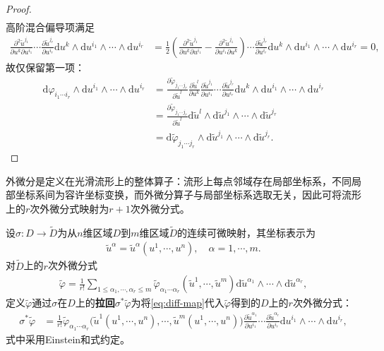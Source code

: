 \documentclass[../../main.tex]{subfiles}%
\begin{document}
\begin{proof}
\begin{align*}
\end{align*}
高阶混合偏导项满足
\begin{align*}
\frac{\partial^2\tilde{u}^{j_1}}{\partial u^k\partial u^{i_1}}\cdots\frac{\partial\tilde{u}^{j_r}}{\partial u^{i_r}}\mathrm{d}u^k\land\mathrm{d}u^{i_1}\land\cdots\land\mathrm{d}u^{i_r} &= \frac{1}{2}\left(\frac{\partial^2\tilde{u}^{j_1}}{\partial u^k\partial u^{i_1}}-\frac{\partial^2\tilde{u}^{j_1}}{\partial u^{i_1}\partial u^k}\right)\cdots\frac{\partial\tilde{u}^{j_r}}{\partial u^{i_r}}\mathrm{d}u^k\land\mathrm{d}u^{i_1}\land\cdots\land\mathrm{d}u^{i_r}=0,
\end{align*}
故仅保留第一项：
\begin{align*}
\mathrm{d}\varphi_{i_1\cdots i_r}\land\mathrm{d}u^{i_1}\land\cdots\land\mathrm{d}u^{i_r} &= \frac{\partial\tilde{\varphi}_{j_1\cdots j_r}}{\partial\tilde{u}^l}\frac{\partial\tilde{u}^l}{\partial u^k}\frac{\partial\tilde{u}^{j_1}}{\partial u^{i_1}}\cdots\frac{\partial\tilde{u}^{j_r}}{\partial u^{i_r}}\mathrm{d}u^k\land\mathrm{d}u^{i_1}\land\cdots\land\mathrm{d}u^{i_r} \\
&= \frac{\partial\tilde{\varphi}_{j_1\cdots j_r}}{\partial\tilde{u}^l}\mathrm{d}\tilde{u}^l\land\mathrm{d}\tilde{u}^{j_1}\land\cdots\land\mathrm{d}\tilde{u}^{j_r} \\
&= \mathrm{d}\tilde{\varphi}_{j_1\cdots j_r}\land\mathrm{d}\tilde{u}^{j_1}\land\cdots\land\mathrm{d}\tilde{u}^{j_r}.
\end{align*}
\end{proof}
\begin{remark}
外微分是定义在光滑流形上的整体算子：流形上每点邻域存在局部坐标系，不同局部坐标系间为容许坐标变换，而外微分算子与局部坐标系选取无关，因此可将流形上的$r$次外微分式映射为$r+1$次外微分式。
\end{remark}

\begin{definition}
设$\sigma:D\to\tilde{D}$为从$n$维区域$D$到$m$维区域$\tilde{D}$的连续可微映射，其坐标表示为
\begin{align}
\tilde{u}^\alpha = \tilde{u}^\alpha(u^1,\cdots,u^n),\quad \alpha=1,\cdots,m. \label{eq:diff-map}
\end{align}
对$\tilde{D}$上的$r$次外微分式
\begin{align*}
\tilde{\varphi} = \frac{1}{r!}\sum\limits_{1\leqslant\alpha_1,\cdots,\alpha_r\leqslant m}\tilde{\varphi}_{\alpha_1\cdots\alpha_r}(\tilde{u}^1,\cdots,\tilde{u}^m)\mathrm{d}\tilde{u}^{\alpha_1}\land\cdots\land\mathrm{d}\tilde{u}^{\alpha_r},
\end{align*}
定义$\tilde{\varphi}$通过$\sigma$在$D$上的\textbf{拉回}$\sigma^*\tilde{\varphi}$为将\eqref{eq:diff-map}代入$\tilde{\varphi}$得到的$D$上的$r$次外微分式：
\begin{align}
\sigma^*\tilde{\varphi} &= \frac{1}{r!}\tilde{\varphi}_{\alpha_1\cdots\alpha_r}\big(\tilde{u}^1(u^1,\cdots,u^n),\cdots,\tilde{u}^m(u^1,\cdots,u^n)\big)\frac{\partial\tilde{u}^{\alpha_1}}{\partial u^{i_1}}\cdots\frac{\partial\tilde{u}^{\alpha_r}}{\partial u^{i_r}}\mathrm{d}u^{i_1}\land\cdots\land\mathrm{d}u^{i_r}, \label{eq:pullback-def}
\end{align}
式中采用Einstein和式约定。
\end{definition}
\end{document}
